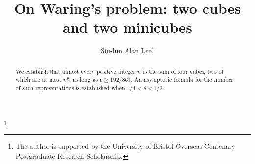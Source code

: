 \documentclass[12pt,english,reqno]{amsart}
\theoremstyle{definition}
\theoremstyle{remark}
\numberwithin{equation}{section}
\numberwithin{equation}{section}
\numberwithin{figure}{section}
\theoremstyle{plain}
\theoremstyle{plain}
\theoremstyle{plain}
\theoremstyle{plain}
\numberwithin{equation}{section}
\numberwithin{thm}{section}
\begin{document}
\title[Waring's problem for cubes]{On Waring's problem: two cubes\\ and two minicubes}
\author[Siu-lun Alan Lee]{Siu-lun Alan Lee$^*$}
\address{School of Mathematics, University of Bristol, University Walk,
 Bristol BS8 1TW, United Kingdom}
\begin{abstract}
We establish that almost every positive integer $n$ is the sum of
four cubes, two of which are at most $n^{\theta}$, as long as $\theta\geq192/869$.
An asymptotic formula for the number of such representations is established
when $1/4<\theta<1/3$.
\end{abstract}
\thanks{The author is supported by the University of Bristol Overseas Centenary
Postgraduate Research Scholarship.}
\maketitle
\end{document}
